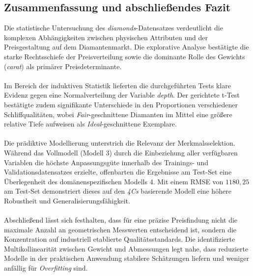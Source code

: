 \subsection{Zusammenfassung und abschließendes Fazit}
Die statistische Untersuchung des \textit{diamonds}-Datensatzes verdeutlicht die komplexen Abhängigkeiten zwischen physischen Attributen und der Preisgestaltung auf dem Diamantenmarkt. Die explorative Analyse bestätigte die starke Rechtsschiefe der Preisverteilung sowie die dominante Rolle des Gewichts (\textit{carat}) als primärer Preisdeterminante.
\\
\\
Im Bereich der induktiven Statistik lieferten die durchgeführten Tests klare Evidenz gegen eine Normalverteilung der Variable \textit{depth}. Der gerichtete t-Test bestätigte zudem signifikante Unterschiede in den Proportionen verschiedener Schliffqualitäten, wobei \textit{Fair}-geschnittene Diamanten im Mittel eine größere relative Tiefe aufweisen als \textit{Ideal}-geschnittene Exemplare.
\\
\\
Die prädiktive Modellierung unterstrich die Relevanz der Merkmalsselektion. Während das Vollmodell (Modell 3) durch die Einbeziehung aller verfügbaren Variablen die höchste Anpassungsgüte innerhalb des Trainings- und Validationsdatensatzes erzielte, offenbarten die Ergebnisse am Test-Set eine Überlegenheit des domänenspezifischen Modells 4. Mit einem RMSE von $1180,25$ am Test-Set demonstriert dieses auf den \textit{4Cs} basierende Modell eine höhere Robustheit und Generalisierungsfähigkeit.
\\
\\
Abschließend lässt sich festhalten, dass für eine präzise Preisfindung nicht die maximale Anzahl an geometrischen Messwerten entscheidend ist, sondern die Konzentration auf industriell etablierte Qualitätsstandards. Die identifizierte Multikollinearität zwischen Gewicht und Abmessungen legt nahe, dass reduzierte Modelle in der praktischen Anwendung stabilere Schätzungen liefern und weniger anfällig für \textit{Overfitting} sind.
